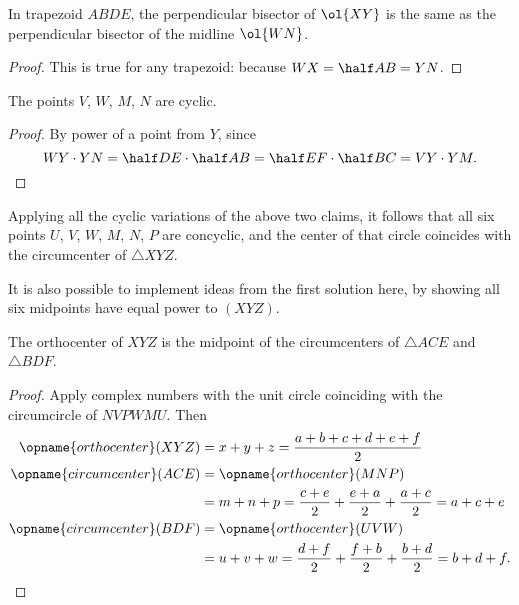 \documentclass[11pt]{scrartcl}
\begin{document}
\begin{claim*}
  In trapezoid $ABDE$, the perpendicular
  bisector of $\ol{XY}$ is the same as the
  perpendicular bisector of the midline $\ol{WN}$.
\end{claim*}
\begin{proof}
  This is true for any trapezoid:
  because $WX = \half AB = YN$.
\end{proof}

\begin{claim*}
  The points $V$, $W$, $M$, $N$ are cyclic.
\end{claim*}
\begin{proof}
  By power of a point from $Y$, since
  \[ WY \cdot YN = \half DE \cdot \half AB
    = \half EF \cdot \half BC
    = VY \cdot YM. \qedhere \]
\end{proof}

Applying all the cyclic variations of the above two claims,
it follows that all six points $U$, $V$, $W$, $M$, $N$, $P$
are concyclic, and the center of that circle
coincides with the circumcenter of $\triangle XYZ$.

\begin{remark*}
  It is also possible to implement ideas from the first solution here,
  by showing all six midpoints have equal power to $(XYZ)$.
\end{remark*}

\begin{claim*}
  The orthocenter of $XYZ$ is the midpoint
  of the circumcenters of $\triangle ACE$ and $\triangle BDF$.
\end{claim*}
\begin{proof}
  Apply complex numbers with the unit circle coinciding
  with the circumcircle of $NVPWMU$.
  Then
  \begin{align*}
    \opname{orthocenter}(XYZ) &= x+y+z = \frac{a+b+c+d+e+f}{2} \\
    \opname{circumcenter}(ACE) &= \opname{orthocenter}(MNP) \\
    &= m+n+p = \frac{c+e}{2} + \frac{e+a}{2} + \frac{a+c}{2} = a+c+e \\
    \opname{circumcenter}(BDF) &= \opname{orthocenter}(UVW) \\
    &= u+v+w = \frac{d+f}{2} + \frac{f+b}{2} + \frac{b+d}{2} = b+d+f.
    \qedhere
  \end{align*}
\end{proof}
\pagebreak
\end{document}
